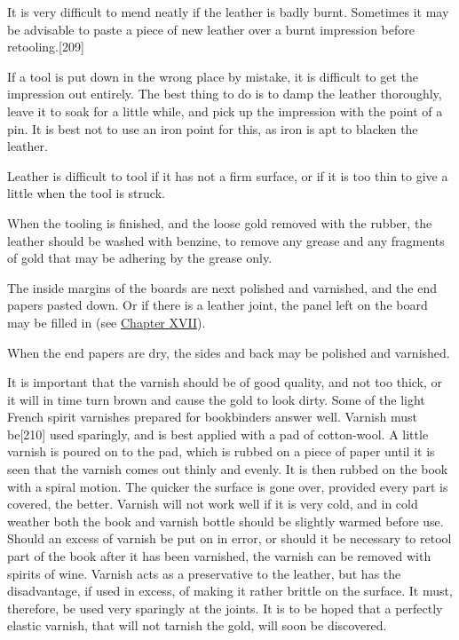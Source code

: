 \documentclass[
]{article}
\begin{document}
It is very difficult to mend neatly if the leather is badly burnt.
Sometimes it may be advisable to paste a piece of new leather over a
burnt impression before
retooling.{\protect\hypertarget{Page_209}{}{{[}209{]}}}

If a tool is put down in the wrong place by mistake, it is difficult to
get the impression out entirely. The best thing to do is to damp the
leather thoroughly, leave it to soak for a little while, and pick up the
impression with the point of a pin. It is best not to use an iron point
for this, as iron is apt to blacken the leather.

Leather is difficult to tool if it has not a firm surface, or if it is
too thin to give a little when the tool is struck.

When the tooling is finished, and the loose gold removed with the
rubber, the leather should be washed with benzine, to remove any grease
and any fragments of gold that may be adhering by the grease only.

The inside margins of the boards are next polished and varnished, and
the end papers pasted down. Or if there is a leather joint, the panel
left on the board may be filled in (see
\protect\hyperlink{CHAPTER_XVII}{Chapter XVII}).

When the end papers are dry, the sides and back may be polished and
varnished.

It is important that the varnish should be of good quality, and not too
thick, or it will in time turn brown and cause the gold to look dirty.
Some of the light French spirit varnishes prepared for bookbinders
answer well. Varnish must
be{\protect\hypertarget{Page_210}{}{{[}210{]}}} used sparingly, and is
best applied with a pad of cotton-wool. A little varnish is poured on to
the pad, which is rubbed on a piece of paper until it is seen that the
varnish comes out thinly and evenly. It is then rubbed on the book with
a spiral motion. The quicker the surface is gone over, provided every
part is covered, the better. Varnish will not work well if it is very
cold, and in cold weather both the book and varnish bottle should be
slightly warmed before use. Should an excess of varnish be put on in
error, or should it be necessary to retool part of the book after it has
been varnished, the varnish can be removed with spirits of wine. Varnish
acts as a preservative to the leather, but has the disadvantage, if used
in excess, of making it rather brittle on the surface. It must,
therefore, be used very sparingly at the joints. It is to be hoped that
a perfectly elastic varnish, that will not tarnish the gold, will soon
be discovered.
\end{document}
